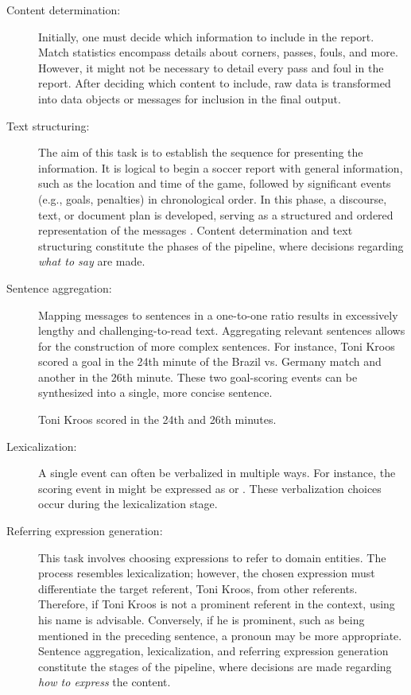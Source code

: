\begin{description}
\item[Content determination:] Initially, one must decide which information to include in the report. Match statistics encompass details about corners, passes, fouls, and more. However, it might not be necessary to detail every pass and foul in the report. After deciding which content to include, raw data is transformed into data objects or messages for inclusion in the final output.

\item[Text structuring:] The aim of this task is to establish the sequence for presenting the information. It is logical to begin a soccer report with general information, such as the location and time of the game, followed by significant events (e.g., goals, penalties) in chronological order. In this phase, a discourse, text, or document plan is developed, serving as a structured and ordered representation of the messages \citep{gatt2018survey}. Content determination and text structuring constitute the  phases of the pipeline, where decisions regarding \textit{what to say} are made.

\item[Sentence aggregation:] Mapping messages to sentences in a one-to-one ratio results in excessively lengthy and challenging-to-read text. Aggregating relevant sentences allows for the construction of more complex sentences. For instance, Toni Kroos scored a goal in the 24th minute of the Brazil vs. Germany match and another in the 26th minute. These two goal-scoring events can be synthesized into a single, more concise sentence.

\begin{exe}
\ex\label{ex:sentenceAggregation} Toni Kroos scored in the 24th and 26th minutes.
\end{exe}

\item[Lexicalization:] A single event can often be verbalized in multiple ways. For instance, the scoring event in  might be expressed as  or . These verbalization choices occur during the lexicalization stage.

\item[Referring expression generation:] This task involves choosing expressions to refer to domain entities. The process resembles lexicalization; however, the chosen expression must differentiate the target referent, Toni Kroos, from other referents. Therefore, if Toni Kroos is not a prominent referent in the context, using his name is advisable. Conversely, if he is prominent, such as being mentioned in the preceding sentence, a pronoun may be more appropriate. Sentence aggregation, lexicalization, and referring expression generation constitute the  stages of the pipeline, where decisions are made regarding \textit{how to express} the content.


\end{description}
